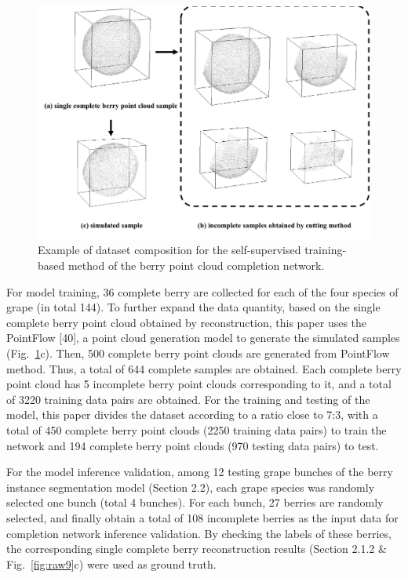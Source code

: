 \documentclass[12pt]{article}
\begin{document}
\begin{figure}[hbt!]
    \centering
    \includegraphics[width=1\textwidth]{figures/Figure9.pdf}
    \caption{Example of dataset composition for the self-supervised training-based method of the berry point cloud completion network.}
    \label{fig:raw12}
\end{figure}

For model training, 36 complete berry are collected for each of the four species of grape (in total 144). 
To further expand the data quantity, based on the single complete berry point cloud obtained by reconstruction, this paper uses the PointFlow [40], a point cloud generation model to generate the simulated samples (Fig.~\ref{fig:raw12}c). 
Then, 500 complete berry point clouds are generated from PointFlow method. 
Thus, a total of 644 complete samples are obtained. 
Each complete berry point cloud has 5 incomplete berry point clouds corresponding to it, and a total of 3220 training data pairs are obtained. 
For the training and testing of the model, this paper divides the dataset according to a ratio close to 7:3, with a total of 450 complete berry point clouds (2250 training data pairs) to train the network and 194 complete berry point clouds (970 testing data pairs) to test.

For the model inference validation, among 12 testing grape bunches of the berry instance segmentation model 
(Section 2.2), each grape species was randomly selected one bunch (total 4 bunches). 
For each bunch, 27 berries are randomly selected, and finally obtain a total of 108 incomplete berries as the input data for completion network inference validation. 
By checking the labels of these berries, the corresponding single complete berry reconstruction results %
(Section 2.1.2 \& Fig.~\ref{fig:raw9}c) were used as ground truth.
\end{document}
